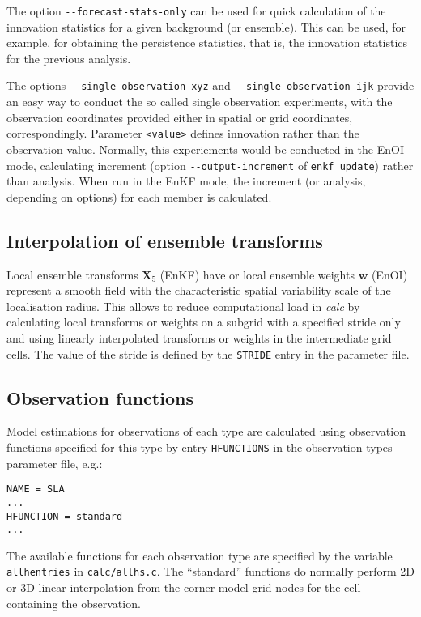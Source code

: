 \documentclass[11pt]{report}
\newcommand{\mb} {\mathbf}
\begin{document}
The option \verb|--forecast-stats-only| can be used for quick calculation of the innovation statistics for a given background (or ensemble).
This can be used, for example, for obtaining the persistence statistics, that is, the innovation statistics for the previous analysis.

The options \verb|--single-observation-xyz| and \verb|--single-observation-ijk| provide an easy way to conduct the so called single observation experiments, with the observation coordinates provided either in spatial or grid coordinates, correspondingly.
Parameter \verb|<value>| defines innovation rather than the observation value.
Normally, this experiements would be conducted in the EnOI mode, calculating increment (option \verb|--output-increment| of \verb|enkf_update|) rather than analysis.
When run in the EnKF mode, the increment (or analysis, depending on options) for each member is calculated.

\subsection{Interpolation of ensemble transforms}

Local ensemble transforms $\mb X_5$ (EnKF) have or local ensemble weights $\mb w$ (EnOI) represent a smooth field with the characteristic spatial variability scale of the localisation radius.
This allows to reduce computational load in \emph{calc} by calculating local transforms or weights on a subgrid with a specified stride only and using linearly interpolated transforms or weights in the intermediate grid cells.
The value of the stride is defined by the \verb|STRIDE| entry in the parameter file.

\subsection{Observation functions}
\label{sec:hfunctions}

Model estimations for observations of each type are calculated using observation functions specified for this type by entry \verb|HFUNCTIONS| in the observation types parameter file, e.g.:
\begin{Verbatim}[frame=single,fontsize=\footnotesize]
NAME = SLA
...
HFUNCTION = standard
...
\end{Verbatim}
The available functions for each observation type are specified by the variable \verb|allhentries| in \verb|calc/allhs.c|.
The ``standard'' functions do normally perform 2D or 3D linear interpolation from the corner model grid nodes for the cell containing the observation.
\end{document}
